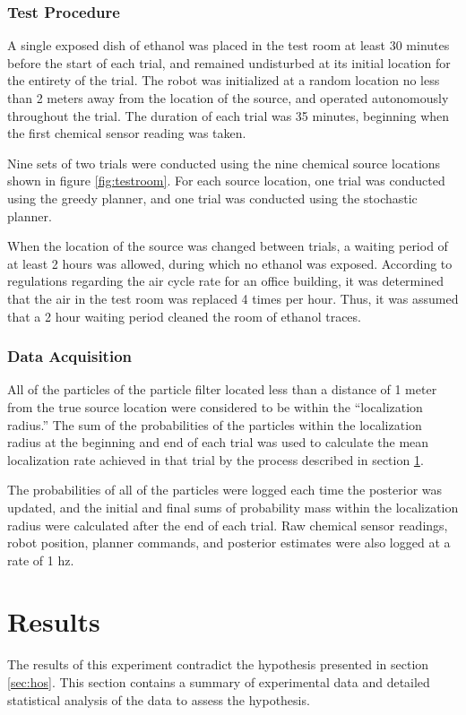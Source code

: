 \documentclass[submit, 12pt]{aiaa-pretty-modified}
\begin{document}
\subsubsection{Test Procedure}
A single exposed dish of ethanol was placed in the test room at least 30
minutes before the start of each trial, and remained undisturbed at
its initial location for the entirety of the trial. The robot was
initialized at a random location no less than 2 meters away from the
location of the source, and operated  autonomously throughout
the trial.  The duration of each trial was 35 minutes, beginning when
the first chemical sensor reading was taken. 

Nine sets of two trials were conducted using the nine chemical source
locations shown in figure \ref{fig:testroom}.  For each source
location, one trial was conducted using the greedy planner, and one trial
was conducted using the stochastic planner.

When the location of the source was changed between trials, a waiting period of at least 2 hours
was allowed, during which no ethanol was exposed. According to regulations regarding the air
cycle rate for an office building, it was determined that the air in
the test room was replaced 4 times per hour.  Thus, it was assumed that a 2 hour waiting
period cleaned the room of ethanol traces.

\subsubsection{Data Acquisition}
All of the particles of the particle filter located less than a distance of 1 meter from the
true source location were considered to be within the ``localization
radius.''  The sum of the probabilities of the particles within the
localization radius at the beginning and end of each trial was used to
calculate the mean localization rate achieved in that trial by the
process described in section \ref{sec:results}.

The probabilities of all of the particles were logged each time the
posterior was updated, and the initial and final sums of probability
mass within the localization radius were calculated after the
end of each trial. Raw chemical sensor readings, robot position, planner commands, and
posterior estimates were also logged at a rate of 1 hz.

\newpage

\section{Results}
\label{sec:results}
The results of this experiment contradict the hypothesis presented in
section \ref{sec:hos}.  This section contains  a summary of experimental data
and detailed statistical analysis of the data to assess the
hypothesis.
\end{document}
